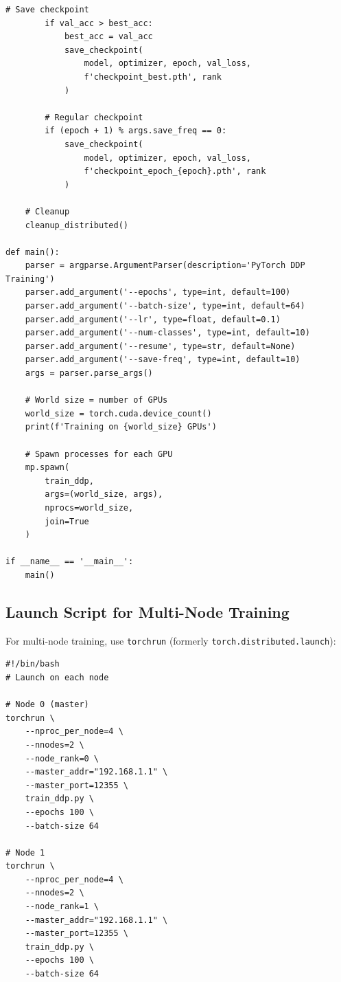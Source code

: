 \begin{lstlisting}[style=python, caption=Complete PyTorch DDP implementation]
        # Save checkpoint
        if val_acc > best_acc:
            best_acc = val_acc
            save_checkpoint(
                model, optimizer, epoch, val_loss,
                f'checkpoint_best.pth', rank
            )

        # Regular checkpoint
        if (epoch + 1) % args.save_freq == 0:
            save_checkpoint(
                model, optimizer, epoch, val_loss,
                f'checkpoint_epoch_{epoch}.pth', rank
            )

    # Cleanup
    cleanup_distributed()

def main():
    parser = argparse.ArgumentParser(description='PyTorch DDP Training')
    parser.add_argument('--epochs', type=int, default=100)
    parser.add_argument('--batch-size', type=int, default=64)
    parser.add_argument('--lr', type=float, default=0.1)
    parser.add_argument('--num-classes', type=int, default=10)
    parser.add_argument('--resume', type=str, default=None)
    parser.add_argument('--save-freq', type=int, default=10)
    args = parser.parse_args()

    # World size = number of GPUs
    world_size = torch.cuda.device_count()
    print(f'Training on {world_size} GPUs')

    # Spawn processes for each GPU
    mp.spawn(
        train_ddp,
        args=(world_size, args),
        nprocs=world_size,
        join=True
    )

if __name__ == '__main__':
    main()
\end{lstlisting}

\subsection{Launch Script for Multi-Node Training}

For multi-node training, use \texttt{torchrun} (formerly \texttt{torch.distributed.launch}):

\begin{lstlisting}[style=shell, caption=Multi-node DDP training script]
#!/bin/bash
# Launch on each node

# Node 0 (master)
torchrun \
    --nproc_per_node=4 \
    --nnodes=2 \
    --node_rank=0 \
    --master_addr="192.168.1.1" \
    --master_port=12355 \
    train_ddp.py \
    --epochs 100 \
    --batch-size 64

# Node 1
torchrun \
    --nproc_per_node=4 \
    --nnodes=2 \
    --node_rank=1 \
    --master_addr="192.168.1.1" \
    --master_port=12355 \
    train_ddp.py \
    --epochs 100 \
    --batch-size 64
\end{lstlisting}

